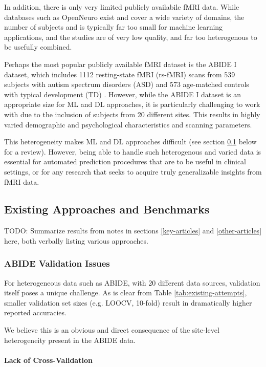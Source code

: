 \documentclass[10pt]{article}
\begin{document}
In addition, there is only very limited publicly availabile fMRI data. While databases such as
OpenNeuro \citep{markiewiczOpenNeuroOpenResource2021} exist and cover a wide variety of domains, the
number of subjects and is typically far too small for machine learning applications, and the studies
are of very  low quality, and far too heterogenous to be usefully combined.

Perhaps the most popular publicly available fMRI dataset is the ABIDE I dataset, which includes 1112
resting-state fMRI (rs-fMRI) scans from 539 subjects with autism spectrum disorders (ASD) and 573
age-matched controls with typical development (TD) \citep{dimartinoAutismBrainImaging2014}. However,
while the ABIDE I dataset is an appropriate size for ML and DL approaches, it is particularly
challenging to work with due to the inclusion of subjects from 20 different sites. This results in
highly varied demographic and psychological characteristics and scanning parameters.

This heterogeneity makes ML and DL approaches difficult (see section \ref{existing-attempts} below
for a review). However, being able to handle such heterogenous and varied data is essential for
automated prediction procedures that are to be useful in clinical settings, or for any research that
seeks to acquire truly generalizable insights from fMRI data.

\subsection{Existing Approaches and Benchmarks} \label{existing-attempts}

TODO: Summarize results from notes in sections \ref{key-articles} and \ref{other-articles} here,
both verbally listing various approaches.

\subsubsection{ABIDE Validation Issues}

For heterogeneous data such as ABIDE, with 20 different data sources, validation itself poses a
unique challenge. As is clear from Table \ref{tab:existing-attempts}, smaller validation set sizes
(e.g. LOOCV, 10-fold) result in dramatically higher reported accuracies.

We believe this is
an obvious and direct consequence of the site-level heterogeneity present in the ABIDE data.

\paragraph{Lack of Cross-Validation}
\end{document}
